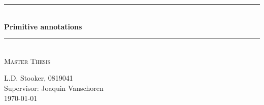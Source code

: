 \documentclass[a4paper,10pt]{article}
\begin{document}
\begin{titlepage}

\newcommand{\HRule}{\rule{\linewidth}{0.5mm}} %

\centering %

\HRule \\[0.4cm]
{ \Huge \bfseries Primitive annotations}\\[0.4cm] %
\HRule \\[1.5cm]


\textsc{\large Master Thesis}\\[1.0cm] %


\vfill %

L.D. Stooker, 0819041 \\ [1cm]
Supervisor: Joaquin Vanschoren \\


{\large \today}\\[3cm] %






\end{titlepage}
\end{document}
